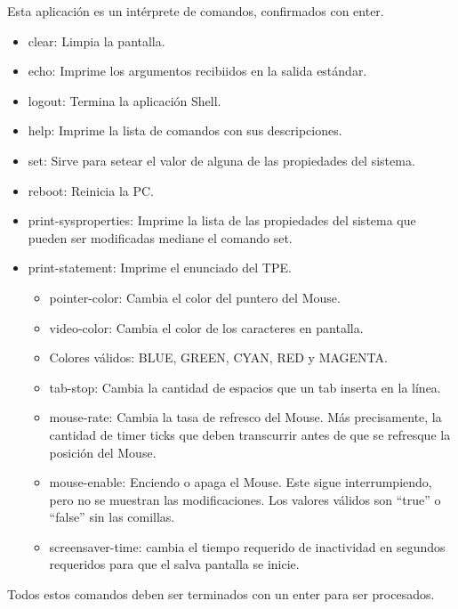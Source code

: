 \documentclass[a4paper,12pt]{article}
\begin{document}
	Esta aplicación es un intérprete de comandos, confirmados con enter.
	\begin{itemize}
		\item 	clear: Limpia la pantalla.
		\item 	echo: Imprime los argumentos recibiidos en la salida estándar.
		\item 	logout: Termina la aplicación Shell.
		\item 	help: Imprime la lista de comandos con sus descripciones.
		\item 	set: Sirve para setear el valor de alguna de las propiedades del sistema.
		\item 	reboot: Reinicia la PC.
		\item 	print-sysproperties: Imprime la lista de las propiedades del sistema que pueden ser modificadas mediane el comando set.
		\item print-statement: Imprime el enunciado del TPE.
		 		\begin{itemize}
					\item 	pointer-color: Cambia el color del puntero del Mouse. 
					\item	video-color: Cambia el color de los caracteres en pantalla.
					\item   Colores válidos: BLUE, GREEN, CYAN, RED y MAGENTA.
					\item	tab-stop: Cambia la cantidad de espacios que un tab inserta en la línea.
					\item	mouse-rate: Cambia la tasa de refresco del Mouse. Más precisamente, la cantidad de timer ticks que deben transcurrir antes de que se refresque la posición del Mouse.
					\item	mouse-enable: Enciendo o apaga el Mouse. Este sigue interrumpiendo, pero no se muestran las modificaciones. Los valores válidos son “true”  o “false” sin las comillas.
					\item	screensaver-time: cambia el tiempo requerido de inactividad en segundos requeridos para que el salva pantalla se inicie.
		
			   	\end{itemize}
	\end{itemize}
	Todos estos comandos deben ser terminados con un enter para ser procesados.
\end{document}
